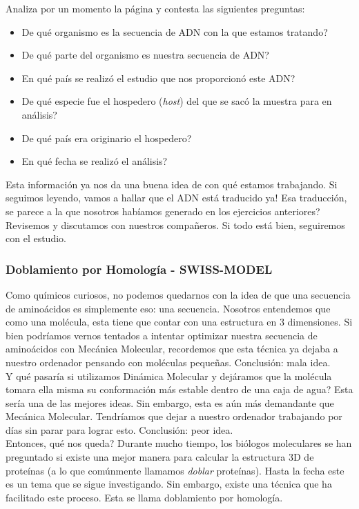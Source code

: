 \documentclass[10pt,letterpaper]{article}
\begin{document}
Analiza por un momento la p\'agina y contesta las siguientes preguntas:

\begin{itemize}
\item De qu\'e organismo es la secuencia de ADN con la que estamos tratando?
\item De qu\'e parte del organismo es nuestra secuencia de ADN?
\item En qu\'e pa\'is se realiz\'o el estudio que nos proporcion\'o este ADN?
\item De qu\'e especie fue el hospedero (\emph{host}) del que se sac\'o la muestra para en an\'alisis?
\item De qu\'e pa\'is era originario el hospedero?
\item En qu\'e fecha se realiz\'o el an\'alisis?
\end{itemize}

Esta informaci\'on ya nos da una buena idea de con qu\'e estamos trabajando. Si seguimos leyendo, vamos a hallar que el ADN est\'a traducido ya! Esa traducci\'on, se parece a la que nosotros hab\'iamos generado en los ejercicios anteriores? Revisemos y discutamos con nuestros compa\~neros. Si todo est\'a bien, seguiremos con el estudio.

\subsubsection{Doblamiento por Homolog\'ia - SWISS-MODEL}
Como qu\'imicos curiosos, no podemos quedarnos con la idea de que una secuencia de amino\'acidos es simplemente eso: una secuencia. Nosotros entendemos que como una mol\'ecula, esta tiene que contar con una estructura en 3 dimensiones. Si bien podr\'iamos vernos tentados a intentar optimizar nuestra secuencia de amino\'acidos con Mec\'anica Molecular, recordemos que esta t\'ecnica ya dejaba a nuestro ordenador pensando con mol\'eculas peque\~nas. Conclusi\'on: mala idea.\\

Y qu\'e pasar\'ia si utilizamos Din\'amica Molecular y dej\'aramos que la mol\'ecula tomara ella misma su conformaci\'on m\'as estable dentro de una caja de agua? Esta ser\'ia una de las mejores ideas. Sin embargo, esta es a\'un m\'as demandante que Mec\'anica Molecular. Tendr\'iamos que dejar a nuestro ordenador trabajando por d\'ias sin parar para lograr esto. Conclusi\'on: peor idea.\\

Entonces, qu\'e nos queda? Durante mucho tiempo, los bi\'ologos moleculares se han preguntado si existe una mejor manera para calcular la estructura 3D de prote\'inas (a lo que com\'unmente llamamos \emph{doblar} prote\'inas). Hasta la fecha este es un tema que se sigue investigando. Sin embargo, existe una t\'ecnica que ha facilitado este proceso. Esta se llama doblamiento por homolog\'ia.\\
\end{document}
